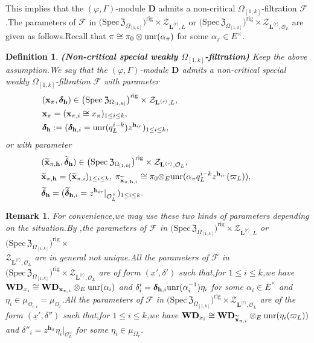 \documentclass[SecEq,CM,GP]{degruyter-crelle} %
\theoremstyle{plain}
\newtheorem{dfn}[thm]{Definition}
\newtheorem{rmk}[thm]{Remark}
\newcommand{\bmdel}{{ \bm{\delta}_\bh}}
\newcommand{\Dpik}{{\mathbf{D}}}
\newcommand{\hpi}{{{\mathbf{h}}}}
\newcommand{\lrr}{{\langle r\rangle}}
\newcommand{\omepik}{\Omega_{[1,k]}}
\newcommand{\rigch}{{\mathcal{Z}_{\bL^{\lrr},\mathcal{O}_L}}}
\newcommand{\rigchl}{{\mathcal{Z}_{\bL^{\lrr},L}}}
\newcommand{\sbanpik}{{\big(\mathrm{Spec}\hspace{2pt}\mathfrak{Z}_{\omepik}\big)^{\mathrm{rig}}}}
\newcommand{\te}{{\otimes_E}}
\newcommand{\unr}{{\rm unr}}
\newcommand{\bL}{{\mathbf{L}}}
\newcommand{\bx}{{\mathbf{x}}}
\newcommand{\bh}{{\mathbf{h}}}
\newcommand{\co}{\mathcal O}
\newcommand{\cF}{\mathcal F}
\begin{document}
This implies that the $(\varphi,\Gamma)$-module $\Dpik$ admits a non-critical $\omepik$-filtration $\cF$.\;The parameters of $\cF$ in $\sbanpik\times\rigchl $ or $\sbanpik\times\rigch$ are given as follows.\;Recall that $\pi\cong \pi_0\otimes\unr(\alpha_\pi )$ for some $\alpha_\pi \in E^\times$.\;

\begin{dfn}\label{weaklynoncritical}\textbf{(Non-critical special weakly $\omepik$-filtration)} Keep the above assumption.\;We say that the $(\varphi,\Gamma)$-module $\Dpik$ admits a non-critical special weakly $\omepik$-filtration $\cF$ with parameter
\begin{equation}
	\begin{aligned}
		&(\bx_{\pi},\bmdel)\in \sbanpik\times\rigchl,\;\hspace{110pt}\\
		&\bx_{\pi}=(\bx_{\pi,i}\cong x_{\pi})_{1\leq i\leq k},\;\\
		&\bmdel:=(\bm{\delta}_{\bh,i}=\unr(  q_L^{i-k}){z^{\hpi_{ir}}})_{1\leq i\leq k},\;
	\end{aligned}
\end{equation}
or with parameter
\begin{equation}
	\begin{aligned}
		&(\widetilde{\bx}_{\pi,\bh},\widetilde{\bm{\delta}}_\bh)\in \sbanpik\times\rigch,\;\hspace{100pt}\\
		&\widetilde{\bx}_{\pi,\bh}=(\widetilde\bx_{\pi,i})_{1\leq i\leq k},\;\pi_{\widetilde\bx_{\pi,\bh,i}}\cong \pi_0\te\unr(\alpha_\pi  q_L^{i-k}z^{\hpi_{ir}}(\varpi_L)),\;\\
		&\widetilde{\bm{\delta}}_\bh=(\widetilde{\bm{\delta}}_{\bh,i}={z^{\hpi_{ir}}}|_{\co_L^\times})_{1\leq i\leq k}.
	\end{aligned}
\end{equation}
\end{dfn}
\begin{rmk}For convenience,\;we may use these two kinds of parameters depending on the situation.\;By \cite[Lemma 4.1.9]{Ding2021},\;the parameters of $\cF$ in $\sbanpik\times\rigchl$ or $\sbanpik\times$\\$\rigch$ are in general not unique.\;All the parameters of $\cF$ in $\sbanpik\times\rigch$ are of form $(\underline{x}',\delta')$ such that,\;for $1\leq i\leq k$,\;we have $\mathbf{WD}_{x_i}\cong \mathbf{WD}_{\bx_{\pi,i}}\otimes_E\unr(\alpha_i)$ and $\delta'_i=\bm{\delta}_{\bh,i}\unr(\alpha_i^{-1})\eta_i$ for some $\alpha_i\in \overline{E}^\times$ and $\eta_i\in \mu_{\Omega_{r,i}}=\mu_{\Omega_{r}}$.\;All the parameters of $\cF$ in $\sbanpik\times\rigch$ are of the form $(\underline{x}',\delta'')$ such that,\;for $1\leq i\leq k$,\;we have $\mathbf{WD}_{x_i}\cong \mathbf{WD}_{\widetilde\bx_{\pi,i}}\otimes_E\unr(\eta_i(\varpi_{L}))$ and $\delta''_i={z^{\hpi_{ir}}}\eta_i|_{\co_L^\times}$ for some $\eta_i\in \mu_{\Omega_{r}}$.\; 
\end{rmk}
\end{document}
